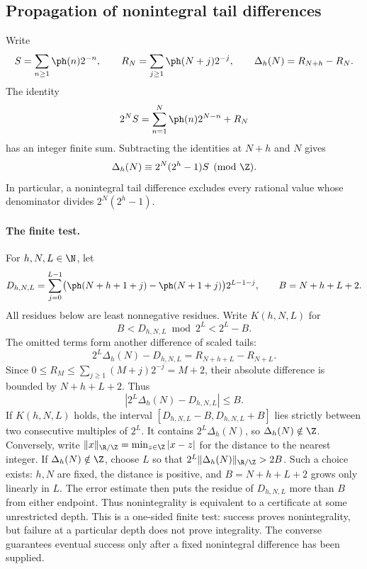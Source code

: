 \subsection{Propagation of nonintegral tail differences}\label{long249:r3-ray}
Write
\[
 S=\sum_{n\ge1}\ph(n)2^{-n},\qquad
 R_N=\sum_{j\ge1}\ph(N+j)2^{-j},\qquad
 \Delta_h(N)=R_{N+h}-R_N.
\]
The identity
\[
 2^NS=\sum_{n=1}^N\ph(n)2^{N-n}+R_N
\]
has an integer finite sum. Subtracting the identities at $N+h$ and $N$
gives
\begin{equation}\label{long249:r3-tail-phase}
 \Delta_h(N)\equiv2^N(2^h-1)S\pmod\Z.
\end{equation}
In particular, a nonintegral tail difference excludes every
rational value whose denominator divides $2^N(2^h-1)$.
\paragraph{The finite test.}
For $h,N,L\in\N$, let
\[
 D_{h,N,L}=\sum_{j=0}^{L-1}
   \bigl(\ph(N+h+1+j)-\ph(N+1+j)\bigr)2^{L-1-j},
 \qquad B=N+h+L+2.
\]
All residues below are least nonnegative residues. Write $K(h,N,L)$ for
\[
 B<D_{h,N,L}\bmod2^L<2^L-B.
\]
The omitted terms form another difference of scaled tails:
\[
 2^L\Delta_h(N)-D_{h,N,L}=R_{N+h+L}-R_{N+L}.
\]
Since $0\le R_M\le\sum_{j\ge1}(M+j)2^{-j}=M+2$, their absolute
difference is bounded by $N+h+L+2$.
Thus
\begin{equation}\label{long249:r3-tail-error}
 |2^L\Delta_h(N)-D_{h,N,L}|\le B.
\end{equation}
If $K(h,N,L)$ holds, the interval
$[D_{h,N,L}-B,D_{h,N,L}+B]$ lies strictly between two consecutive
multiples of $2^L$. It contains $2^L\Delta_h(N)$, so
$\Delta_h(N)\notin\Z$.
Conversely, write $\|x\|_{\R/\Z}=\min_{z\in\Z}|x-z|$ for the distance to
the nearest integer. If $\Delta_h(N)\notin\Z$, choose $L$ so that
$2^L\|\Delta_h(N)\|_{\R/\Z}>2B$. Such a choice exists: $h,N$ are fixed,
the distance is positive, and $B=N+h+L+2$ grows only linearly in $L$.
The error estimate then puts the residue of $D_{h,N,L}$ more than $B$
from either endpoint. Thus nonintegrality is equivalent to a certificate
at some unrestricted depth. This is a one-sided finite test: success
proves nonintegrality, but failure at a particular depth does not prove
integrality. The converse guarantees eventual success only after a
fixed nonintegral difference has been supplied.

